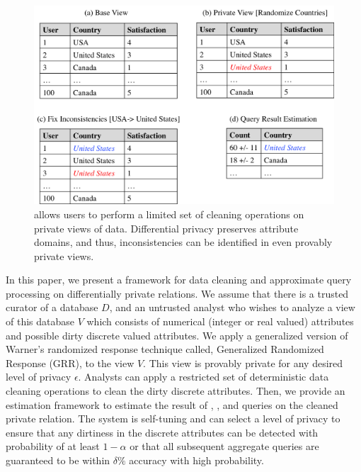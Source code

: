 \begin{figure}[t]
\centering
 \includegraphics[width=\columnwidth]{figs/example.png}
 \caption{\sys allows users to perform a limited set of cleaning operations on private views of data. Differential privacy preserves attribute domains, and thus, inconsistencies can be identified in even provably private views.\label{example}}\vspace{-2em}
\end{figure}

In this paper, we present \sys a framework for data cleaning and approximate query processing on differentially private relations.
We assume that there is a trusted curator of a database $D$, and an untrusted analyst who wishes to analyze a view of this database $V$ which consists of numerical (integer or real valued) attributes and possible dirty discrete valued attributes.
We apply a generalized version of Warner's randomized response technique called, Generalized Randomized Response (GRR), to the view $V$.
This view is provably private for any desired level of privacy $\epsilon$.
Analysts can apply a restricted set of deterministic data cleaning operations to clean the dirty discrete attributes.
Then, we provide an estimation framework to estimate the result of \sumfunc, \countfunc, and \avgfunc queries on the cleaned private relation.
The system is self-tuning and can select a level of privacy to ensure that any dirtiness in the discrete attributes can be detected with probability of at least $1-\alpha$ or that all subsequent aggregate queries are guaranteed to be within $\delta\%$ accuracy with high probability.

